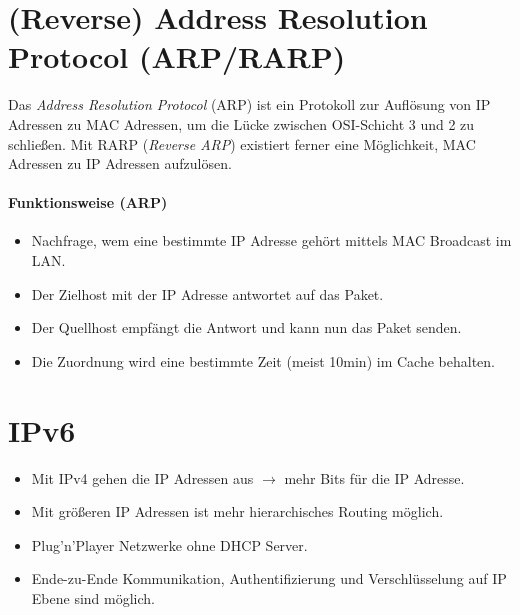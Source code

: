 	\section{(Reverse) Address Resolution Protocol (ARP/RARP)}
		Das \textit{Address Resolution Protocol} (ARP) ist ein Protokoll zur Auflösung von IP Adressen zu MAC Adressen, um die Lücke zwischen OSI-Schicht 3 und 2 zu schließen. Mit RARP (\textit{Reverse ARP}) existiert ferner eine Möglichkeit, MAC Adressen zu IP Adressen aufzulösen.

		\paragraph{Funktionsweise (ARP)}
			\begin{itemize}
				\item Nachfrage, wem eine bestimmte IP Adresse gehört mittels MAC Broadcast im LAN.
				\item Der Zielhost mit der IP Adresse antwortet auf das Paket.
				\item Der Quellhost empfängt die Antwort und kann nun das Paket senden.
				\item Die Zuordnung wird eine bestimmte Zeit (meist 10min) im Cache behalten.
			\end{itemize}


	\section{IPv6}
		\begin{itemize}
			\item Mit IPv4 gehen die IP Adressen aus \( \rightarrow \) mehr Bits für die IP Adresse.
			\item Mit größeren IP Adressen ist mehr hierarchisches Routing möglich.
			\item Plug'n'Player Netzwerke ohne DHCP Server.
			\item Ende-zu-Ende Kommunikation, Authentifizierung und Verschlüsselung auf IP Ebene sind möglich.
		\end{itemize}

